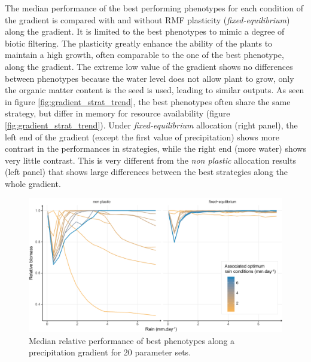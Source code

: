 The median performance of the best performing phenotypes for each condition of the gradient is compared with and without RMF plasticity (\textit{fixed-equilibrium}) along the gradient. It is limited to the best phenotypes to mimic a degree of biotic filtering. The plasticity greatly enhance the ability of the plants to maintain a high growth, often comparable to the one of the best phenotype, along the gradient. The extreme low value of the gradient shows no differences between phenotypes because the water level does not allow plant to grow, only the organic matter content is the seed is used, leading to similar outputs. As seen in figure \ref{fig:gradient_strat_trend}, the best phenotypes often share the same strategy, but differ in memory for resource availability (figure \ref{fig:gradient_strat_trend}). Under \textit{fixed-equilibrium} allocation (right panel), the left end of the gradient (except the first value of precipitation) shows more contrast in the performances in strategies, while the right end (more water) shows very little contrast. This is very different from the \textit{non plastic} allocation results (left panel) that shows large differences between the best strategies along the whole gradient.  

\begin{figure}\label{fig:gradient_ranking}
\includegraphics[width = \textwidth]{./2_PP/Figures/Rain/optimum_shifting_median.pdf}
\caption{Median relative performance of best phenotypes along a precipitation gradient for 20 parameter sets.}
\end{figure}

%
%




